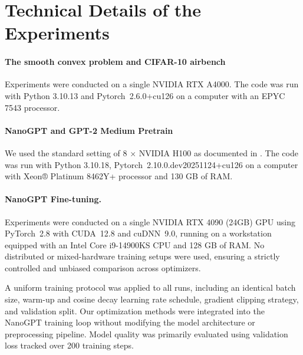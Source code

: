 \documentclass[smallextended,referee,envcountsect]{svjour3}
\begin{document}
 \section{Technical Details of the Experiments}
 
 \paragraph{The smooth convex problem and CIFAR-10 airbench} Experiments were conducted on a single NVIDIA RTX A4000. The code was run with Python 3.10.13 and Pytorch~2.6.0+cu126 on a computer with an EPYC 7543 processor.
 
 \paragraph{NanoGPT and GPT-2 Medium Pretrain} We used the standard setting of 8 $\times$ NVIDIA H100 as documented in \citep{modded_nanogpt_2024}. The code was run with Python 3.10.18, Pytorch~2.10.0.dev20251124+cu126 on a computer with Xeon® Platinum 8462Y+ processor and 130 GB of RAM.
 
 \paragraph{NanoGPT Fine-tuning.} Experiments were conducted on a single NVIDIA RTX 4090 (24GB) GPU using PyTorch~2.8 with CUDA~12.8 and cuDNN~9.0, running on a workstation equipped with an Intel Core i9-14900KS CPU and 128 GB of RAM. No distributed or mixed-hardware training setups were used, ensuring a strictly controlled and unbiased comparison across optimizers.
 
 A uniform training protocol was applied to all runs, including an identical batch size, warm-up and cosine decay learning rate schedule, gradient clipping strategy, and validation split. Our optimization methods were integrated into the NanoGPT training loop without modifying the model architecture or preprocessing pipeline. Model quality was primarily evaluated using validation loss tracked over 200 training steps.
 
 
\end{document}
